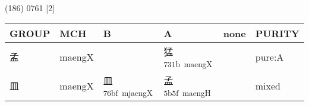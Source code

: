 \documentclass[14pt,a4paper]{scrartcl}
\begin{document}
(186) 0761 {[}2{]}

\begin{longtable}[c]{@{}llllll@{}}
\toprule
\begin{minipage}[b]{0.14\columnwidth}\raggedright\strut
GROUP
\strut\end{minipage} &
\begin{minipage}[b]{0.14\columnwidth}\raggedright\strut
MCH
\strut\end{minipage} &
\begin{minipage}[b]{0.14\columnwidth}\raggedright\strut
B
\strut\end{minipage} &
\begin{minipage}[b]{0.14\columnwidth}\raggedright\strut
A
\strut\end{minipage} &
\begin{minipage}[b]{0.14\columnwidth}\raggedright\strut
none
\strut\end{minipage} &
\begin{minipage}[b]{0.14\columnwidth}\raggedright\strut
PURITY
\strut\end{minipage}\tabularnewline
\midrule
\endhead
\begin{minipage}[t]{0.14\columnwidth}\raggedright\strut
孟
\strut\end{minipage} &
\begin{minipage}[t]{0.14\columnwidth}\raggedright\strut
maengX
\strut\end{minipage} &
\begin{minipage}[t]{0.14\columnwidth}\raggedright\strut
\strut\end{minipage} &
\begin{minipage}[t]{0.14\columnwidth}\raggedright\strut
猛\textsuperscript{731b~maengX}
\strut\end{minipage} &
\begin{minipage}[t]{0.14\columnwidth}\raggedright\strut
\strut\end{minipage} &
\begin{minipage}[t]{0.14\columnwidth}\raggedright\strut
pure:A
\strut\end{minipage}\tabularnewline
\begin{minipage}[t]{0.14\columnwidth}\raggedright\strut
皿
\strut\end{minipage} &
\begin{minipage}[t]{0.14\columnwidth}\raggedright\strut
maengX
\strut\end{minipage} &
\begin{minipage}[t]{0.14\columnwidth}\raggedright\strut
皿\textsuperscript{76bf~mjaengX}
\strut\end{minipage} &
\begin{minipage}[t]{0.14\columnwidth}\raggedright\strut
孟\textsuperscript{5b5f~maengH}
\strut\end{minipage} &
\begin{minipage}[t]{0.14\columnwidth}\raggedright\strut
\strut\end{minipage} &
\begin{minipage}[t]{0.14\columnwidth}\raggedright\strut
mixed
\strut\end{minipage}\tabularnewline
\bottomrule
\end{longtable}
\end{document}
